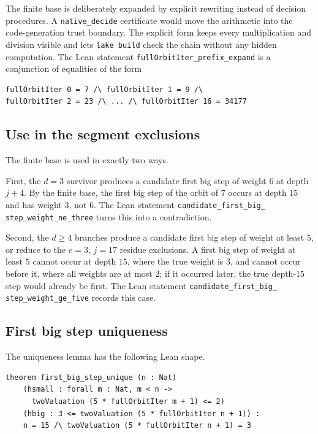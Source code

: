 The finite base is deliberately expanded by explicit rewriting instead
of decision procedures.  A \texttt{native\_decide} certificate would
move the arithmetic into the code-generation trust boundary.  The
explicit form keeps every multiplication and division visible and lets
\texttt{lake build} check the chain without any hidden computation.
The Lean statement
\texttt{fullOrbitIter\_\allowbreak prefix\_\allowbreak expand}
is a conjunction of equalities of the form
\begin{verbatim}
fullOrbitIter 0 = 7 /\ fullOrbitIter 1 = 9 /\
fullOrbitIter 2 = 23 /\ ... /\ fullOrbitIter 16 = 34177
\end{verbatim}

\subsection{Use in the segment exclusions}

The finite base is used in exactly two ways.

First, the $d=3$ survivor produces a candidate first big step of
weight $6$ at depth $j+4$.  By the finite base, the first big step of
the orbit of $7$ occurs at depth $15$ and has weight $3$, not $6$.
The Lean statement
\texttt{candidate\_\allowbreak first\_\allowbreak big\_\allowbreak
step\_\allowbreak weight\_\allowbreak ne\_\allowbreak three} turns this
into a contradiction.

Second, the $d\ge4$ branches produce a candidate first big step of
weight at least $5$, or reduce to the $e=3$, $j=17$ residue
exclusions.  A first big step of weight at least $5$ cannot occur at
depth $15$, where the true weight is $3$, and cannot occur before it,
where all weights are at most $2$; if it occurred later, the true
depth-$15$ step would already be first.  The Lean statement
\texttt{candidate\_\allowbreak first\_\allowbreak big\_\allowbreak
step\_\allowbreak weight\_\allowbreak ge\_\allowbreak five} records this
case.

\subsection{First big step uniqueness}

The uniqueness lemma has the following Lean shape.
\begin{verbatim}
theorem first_big_step_unique (n : Nat)
    (hsmall : forall m : Nat, m < n ->
      twoValuation (5 * fullOrbitIter m + 1) <= 2)
    (hbig : 3 <= twoValuation (5 * fullOrbitIter n + 1)) :
    n = 15 /\ twoValuation (5 * fullOrbitIter n + 1) = 3
\end{verbatim}

